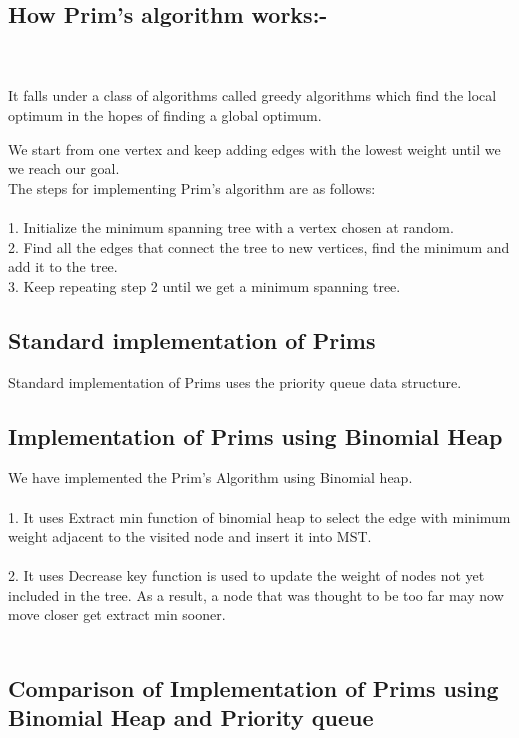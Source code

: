\documentclass[10pt,a4paper]{article}
\begin{document}
\subsection*{How Prim's algorithm works:-}\\ \\ 
	It falls under a class of algorithms called greedy algorithms which find the local optimum in the hopes of finding a global optimum.

	We start from one vertex and keep adding edges with the lowest weight until we we reach our goal. \\

The steps for implementing Prim's algorithm are as follows:\\ \\

1. Initialize the minimum spanning tree with a vertex chosen at random.\\
2. Find all the edges that connect the tree to new vertices, find the minimum and add it to the tree.\\
3. Keep repeating step 2 until we get a minimum spanning tree.\\

\subsection*{Standard implementation of Prims}
	Standard implementation of Prims uses the priority queue data structure.
	
\subsection*{Implementation of Prims using Binomial Heap}
	We have implemented the Prim's Algorithm using Binomial heap.\\ \\
	1. It uses Extract min function of binomial heap to select the edge with minimum weight  adjacent to the visited node and insert it into MST. \\ \\
	2. It uses Decrease key function is used to update the weight of nodes not yet included in the tree. As a result, a node that was thought to be too far may now move closer get extract min sooner. \\ \\
	
	
\subsection*{Comparison of Implementation of Prims using Binomial Heap and Priority queue}
\end{document}
